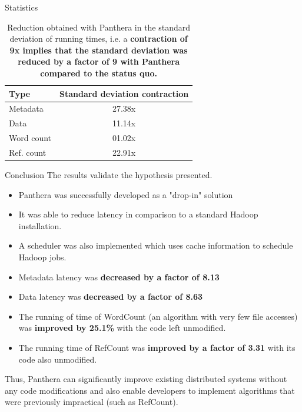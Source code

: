 \documentclass[final]{beamer} %
\begin{document}
\begin{frame}
\begin{columns}[t]
\begin{column}{0.32\textwidth}
\begin{block}{Statistics}
 	\vspace{1em}
	\begin{table}
	\setlength{\tabcolsep}{25pt}
	\centering
	\begin{tabular}{lc}
		\toprule
		\textbf{Type} & \textbf{Standard deviation contraction} \\
		\midrule
		Metadata   & 27.38x \\
		Data       & 11.14x \\
		Word count &  \phantom01.02x \\
		Ref. count & 22.91x \\
	\bottomrule
	\end{tabular}
	\caption{Reduction obtained with Panthera in the standard deviation of running times, i.e. a \textbf{contraction of 9x implies that the standard deviation was reduced
	by a factor of 9 with Panthera compared to the status quo.}}
	\end{table}

    \end{block}
    
    	\begin{block}{Conclusion}
    	The results validate the hypothesis presented.
    	\begin{itemize}
    		\item Panthera was successfully developed as a "drop-in" solution
    		\item It was able to reduce latency in comparison to a standard Hadoop installation. 
    		\item A scheduler was also implemented which uses cache information to schedule
    		Hadoop jobs.
    		\item Metadata latency was \textbf{decreased by a factor of 8.13}
    		\item Data latency was \textbf{decreased by a factor of 8.63}
    		\item The running of time of WordCount (an algorithm with very few file accesses) was \textbf{improved by 25.1\%} with the code left unmodified.
		\item The running time of RefCount was \textbf{improved by a factor of 3.31} with its code also unmodified.
    	\end{itemize}
	 
    Thus, Panthera can significantly improve existing distributed systems
    without any code modifications and also enable developers to 
    implement algorithms that were previously impractical (such as RefCount).
	
	\end{block}
	

\end{column}
\end{columns}
\end{frame}
\end{document}

